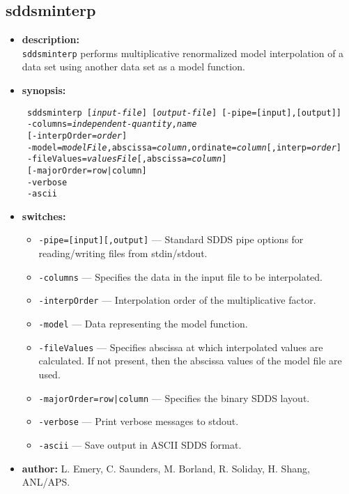 \newpage 
\subsection{sddsminterp} 
\label{sddsminterp} 
 
\begin{itemize} 
\item {\bf description:} \hspace*{1mm}\\ 
{\tt sddsminterp} performs multiplicative renormalized model interpolation of a data set using another data set as a model function.
\item {\bf synopsis:}  
\begin{flushleft}
{\tt 
sddsminterp [{\em input-file}] [{\em output-file}] [-pipe=[input],[output]] \\ \
-columns={\em independent-quantity},{\em name} \\ \
[-interpOrder={\em order}] \\ \
-model={\em modelFile},abscissa={\em column},ordinate={\em column}[,interp={\em order}] \\ \
-fileValues={\em valuesFile}[,abscissa={\em column}] \\ \
[-majorOrder=row|column] \\ \
-verbose \\ \
-ascii}
\end{flushleft} 
\item {\bf switches:} 
    \begin{itemize} 
    \item {\tt -pipe=[input][,output]} --- Standard SDDS pipe options for reading/writing files from stdin/stdout.
    \item {\tt -columns} --- Specifies the data in the input file to be interpolated.
    \item {\tt -interpOrder} --- Interpolation order of the multiplicative factor.
    \item {\tt -model} --- Data representing the model function.
    \item {\tt -fileValues} --- Specifies abscissa at which interpolated values are calculated. If not present, then the abscissa values of the model file are used.
    \item {\tt -majorOrder=row|column} --- Specifies the binary SDDS layout.
    \item {\tt -verbose} --- Print verbose messages to stdout.
    \item {\tt -ascii} --- Save output in ASCII SDDS format.
\end{itemize} 

\item {\bf author:} L. Emery, C. Saunders, M. Borland, R. Soliday, H. Shang, ANL/APS. 
\end{itemize} 
